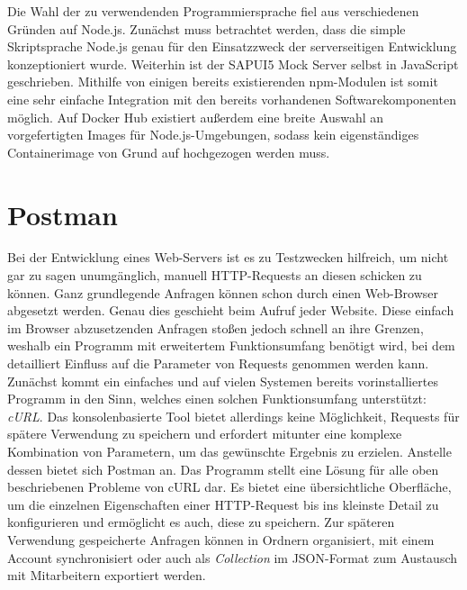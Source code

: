 Die Wahl der zu verwendenden Programmiersprache fiel aus verschiedenen Gründen auf Node.js.
Zunächst muss betrachtet werden, dass die simple Skriptsprache Node.js genau für den Einsatzzweck der serverseitigen Entwicklung konzeptioniert wurde.
Weiterhin ist der SAPUI5 Mock Server selbst in JavaScript geschrieben.
Mithilfe von einigen bereits existierenden \ac{npm}-Modulen ist somit eine sehr einfache Integration mit den bereits vorhandenen Softwarekomponenten möglich.
Auf Docker Hub existiert außerdem eine breite Auswahl an vorgefertigten Images für Node.js-Umgebungen, sodass kein eigenständiges Containerimage von Grund auf hochgezogen werden muss.


\section{Postman}
Bei der Entwicklung eines Web-Servers ist es zu Testzwecken hilfreich, um nicht gar zu sagen unumgänglich, manuell \ac{HTTP}-Requests an diesen schicken zu können.
Ganz grundlegende Anfragen können schon durch einen Web-Browser abgesetzt werden.
Genau dies geschieht beim Aufruf jeder Website.
Diese einfach im Browser abzusetzenden Anfragen stoßen jedoch schnell an ihre Grenzen, weshalb ein Programm mit erweitertem Funktionsumfang benötigt wird, bei dem detailliert Einfluss auf die Parameter von Requests genommen werden kann.
Zunächst kommt ein einfaches und auf vielen Systemen bereits vorinstalliertes Programm in den Sinn, welches einen solchen Funktionsumfang unterstützt: \emph{cURL}.
Das konsolenbasierte Tool bietet allerdings keine Möglichkeit, Requests für spätere Verwendung zu speichern und erfordert mitunter eine komplexe Kombination von Parametern, um das gewünschte Ergebnis zu erzielen.
Anstelle dessen bietet sich Postman an.
Das Programm stellt eine Lösung für alle oben beschriebenen Probleme von cURL dar.
Es bietet eine übersichtliche Oberfläche, um die einzelnen Eigenschaften einer \ac{HTTP}-Request bis ins kleinste Detail zu konfigurieren und ermöglicht es auch, diese zu speichern.
Zur späteren Verwendung gespeicherte Anfragen können in Ordnern organisiert, mit einem Account synchronisiert oder auch als \emph{Collection} im \ac{JSON}-Format zum Austausch mit Mitarbeitern exportiert werden.~\cite{postman, postman-curl}

